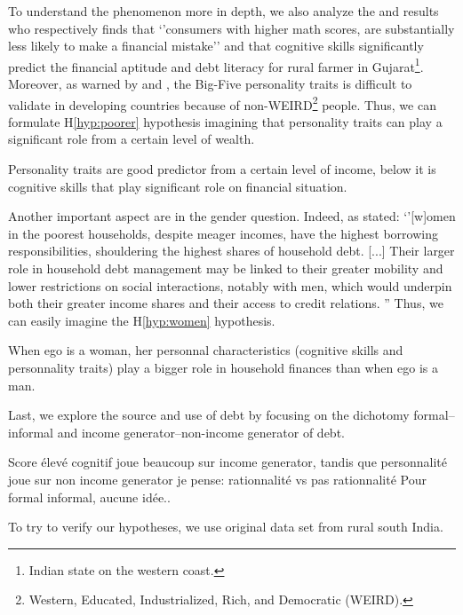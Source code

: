 \documentclass[a4paper, 11pt, onecolumn]{article}
\begin{document}
To understand the phenomenon more in depth, we also analyze the \cite{Agarwal2013} and \cite{Gaurav2012} results who respectively finds that `'consumers with higher math scores, are substantially less likely to make a financial mistake'' and that cognitive skills significantly predict the financial aptitude and debt literacy for rural farmer in Gujarat\footnote{Indian state on the western coast.}. 
Moreover, as warned by \cite{Laajaj2017} and \cite{Laajaj2019}, the Big-Five personality traits is difficult to validate in developing countries because of non-WEIRD\footnote{Western, Educated, Industrialized, Rich, and Democratic (WEIRD).} people.
Thus, we can formulate H\ref{hyp:poorer} hypothesis imagining that personality traits can play a significant role from a certain level of wealth.
\begin{hyp} \label{hyp:poorer}
Personality traits are good predictor from a certain level of income, below it is cognitive skills that play significant role on financial situation. 
\end{hyp}

Another important aspect are in the gender question.
Indeed, as \cite{Reboul2020} stated: `'[w]omen in the poorest households, despite meager incomes, have the highest borrowing responsibilities, shouldering the highest shares of household debt. [...] Their larger role in household debt management may be linked to their greater mobility and lower restrictions on social interactions, notably with men, which would underpin both their greater income shares and their access to credit relations. ''
Thus, we can easily imagine the H\ref{hyp:women} hypothesis.
\begin{hyp} \label{hyp:women}
When ego is a woman, her personnal characteristics (cognitive skills and personnality traits) play a bigger role in household finances than when ego is a man.
\end{hyp}

Last, we explore the source and use of debt by focusing on the dichotomy formal--informal and income generator--non-income generator of debt.
\begin{hyp} \label{hyp:filr}
Score élevé cognitif joue beaucoup sur income generator, tandis que personnalité joue sur non income generator je pense: rationnalité vs pas rationnalité
Pour formal informal, aucune idée..
\end{hyp}


To try to verify our hypotheses, we use original data set from rural south India.
\end{document}
